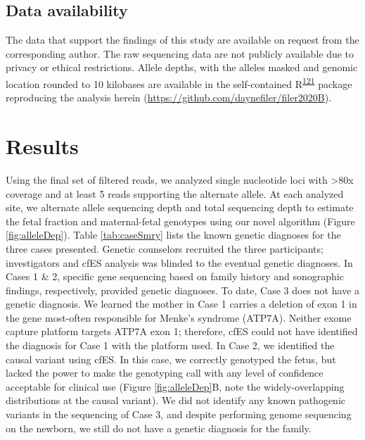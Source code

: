 \documentclass[11pt,letterpaper]{book}
\begin{document}
\hypertarget{data-availability}{%
\subsection{Data availability}\label{data-availability}}

The data that support the findings of this study are available on request from the corresponding author.
The raw sequencing data are not publicly available due to privacy or ethical restrictions.
Allele depths, with the alleles masked and genomic location rounded to 10 kilobases are available in the self-contained R\textsuperscript{\protect\hyperlink{ref-r-core-team:2019aa}{121}} package reproducing the analysis herein (\url{https://github.com/daynefiler/filer2020B}).

\hypertarget{results-1}{%
\section{Results}\label{results-1}}

Using the final set of filtered reads, we analyzed single nucleotide loci with \textgreater80x coverage and at least 5 reads supporting the alternate allele.
At each analyzed site, we alternate allele sequencing depth and total sequencing depth to estimate the fetal fraction and maternal-fetal genotypes using our novel algorithm (Figure \ref{fig:alleleDep}).
Table \ref{tab:caseSmry} lists the known genetic diagnoses for the three cases presented.
Genetic counselors recruited the three participants; investigators and cfES analysis was blinded to the eventual genetic diagnoses.
In Cases 1 \& 2, specific gene sequencing based on family history and sonographic findings, respectively, provided genetic diagnoses.
To date, Case 3 does not have a genetic diagnosis.
We learned the mother in Case 1 carries a deletion of exon 1 in the gene most-often responsible for Menke's syndrome (ATP7A).
Neither exome capture platform targets ATP7A exon 1; therefore, cfES could not have identified the diagnosis for Case 1 with the platform used.
In Case 2, we identified the causal variant using cfES.
In this case, we correctly genotyped the fetus, but lacked the power to make the genotyping call with any level of confidence acceptable for clinical use (Figure \ref{fig:alleleDep}B, note the widely-overlapping distributions at the causal variant).
We did not identify any known pathogenic variants in the sequencing of Case 3, and despite performing genome sequencing on the newborn, we still do not have a genetic diagnosis for the family.
\end{document}
